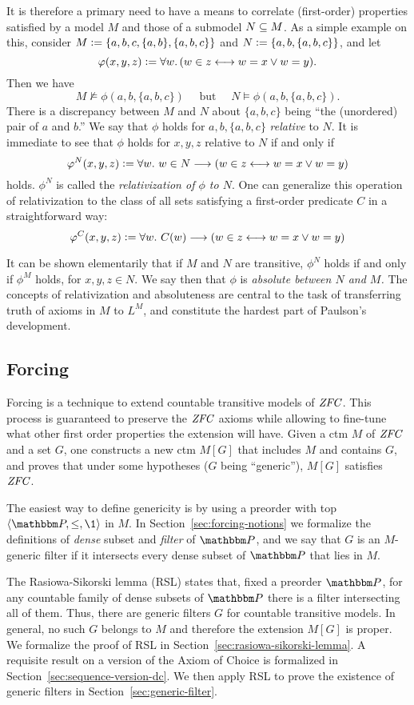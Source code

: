 %
%
%
%
%
%
It is therefore a primary need to have a means to correlate  (first-order)
properties satisfied by a model $M$ and those of a 
submodel $N\subseteq M$. As a simple example on this, consider 
%
%
%
%
%
%
%
%
%
$M\mathrel{\mathop:}= \{a,b,c, \{a,b\},\{a,b,c\}\}$ and
$N\mathrel{\mathop:}=\{a,b,\{a,b,c\}\}$, and let 
\[
\varphi(x,y,z)\mathrel{\mathop:}= \forall w.\,( w\in z \longleftrightarrow w=x \vee w=y).
\]
%
Then we have
\[
M\not\models \phi(a,b,\{a,b,c\}) \quad\text{ but }\quad N\models \phi(a,b,\{a,b,c\}).
\]
There is a discrepancy between  $M$ and $N$ about $\{a,b,c\}$ being ``the
(unordered) pair of $a$ and $b$.'' We say that $\phi$ holds for
$a,b,\{a,b,c\}$ \emph{relative} to $N$. It is immediate to see that
$\phi$ holds  for $x,y,z$ relative to $N$ if and only if
\[
\varphi^N(x,y,z)\mathrel{\mathop:}= \forall w.\ w\in N\longrightarrow ( w\in z \longleftrightarrow w=x \vee w=y)
\] 
holds. $\phi^N$ is called the \emph{relativization of $\phi$ to
  $N$}. One can generalize this operation of relativization to the
class of all sets satisfying a first-order predicate $C$ in a
straightforward way:
\[
\varphi^C(x,y,z)\mathrel{\mathop:}= \forall w.\ C(w)\longrightarrow ( w\in z \longleftrightarrow w=x \vee w=y)
\] 

It can be shown elementarily that if $M$ and $N$ are transitive,
$\phi^N$ holds if and only if $\phi^M$ holds,  for $x,y,z\in N$. We
say then that $\phi$ is \emph{absolute between $N$ and $M$.}
%
%
The concepts of relativization and absoluteness are central to the
task of transferring truth of axioms in $M$ to $L^M$, and constitute
the hardest part of Paulson's development.


\subsection{Forcing}
%
%
%
Forcing is a technique to extend countable transitive models of
$\mathit{ZFC}$. This process is guaranteed to preserve the $\mathit{ZFC}$
axioms while allowing to fine-tune what other first order properties the
extension will have. Given a ctm $M$  of $\mathit{ZFC}$ and a set $G$, one constructs a new
ctm  $M[G]$  that includes $M$ and
contains $G$, and proves that under some hypotheses ($G$ being ``generic''),
$M[G]$ satisfies $\mathit{ZFC}$.

The easiest way to define genericity is by using a preorder with top
$\lb\PP,\leq,\1\rb$ in $M$.   
In Section~\ref{sec:forcing-notions} we formalize the definitions of
\emph{dense} subset and  \emph{filter} of  $\PP$, and we say that  $G$
is an $M$-generic filter
if it intersects every dense subset of $\PP$ that lies in $M$.

%
%
%
%
%
The Rasiowa-Sikorski lemma (RSL) states that, fixed a preorder $\PP$, for
any countable family of dense subsets of $\PP$ there is a filter
intersecting all of them. Thus, there are generic filters $G$ for
countable transitive models. In general, no such $G$ belongs to $M$ and
therefore the extension $M[G]$ is proper. We formalize the proof of
RSL in
Section~\ref{sec:rasiowa-sikorski-lemma}. A requisite result on a
version of the Axiom of Choice is formalized in
Section~\ref{sec:sequence-version-dc}. We then apply RSL to prove the existence of generic
filters in Section~\ref{sec:generic-filter}. 

